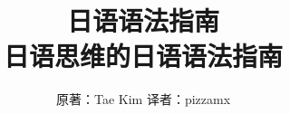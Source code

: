 \documentclass[UTF8, a4paper, 11pt, twoside]{ctexbook}
\title{%
    日语语法指南\\
    \Large 日语思维的日语语法指南}
\author{原著：Tae Kim 译者：pizzamx}
\begin{document}
\tkbegin


\end{document}
